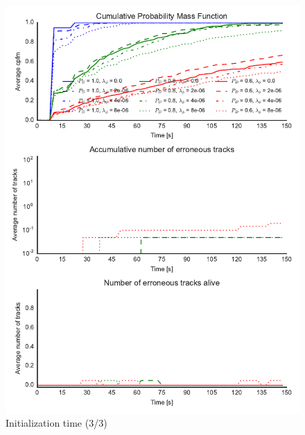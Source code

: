 \begin{figure}
\centering
\includegraphics{Figures/plots/Scenario1_Init-Time(3-3).pdf}
\caption{Initialization time (3/3)}\label{fig:init_time_3-3}
\end{figure}

